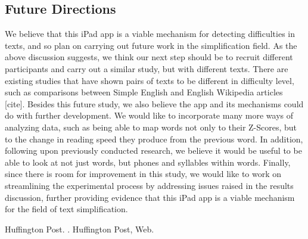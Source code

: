 \documentclass[11pt,letterpaper]{article}
\begin{document}
	\subsection{Future Directions}
	
	We believe that this iPad app is a viable mechanism for detecting difficulties in texts, and so plan on carrying out future work in the simplification field. As the above discussion suggests, we think our next step should be to recruit different participants and carry out a similar study, but with different texts. There are existing studies that have shown pairs of texts to be different in difficulty level, such as comparisons between Simple English and English Wikipedia articles [cite]. Besides this future study, we also believe the app and its mechanisms could do with further development. We would like to incorporate many more ways of analyzing data, such as being able to map words not only to their Z-Scores, but to the change in reading speed they produce from the previous word. In addition, following upon previously conducted research, we believe it would be useful to be able to look at not just words, but phones and syllables within words. Finally, since there is room for improvement in this study, we would like to work on streamlining the experimental process by addressing issues raised in the results discussion, further providing evidence that this iPad app is a viable mechanism for the field of text simplification.
	
%	
	
	\begin{thebibliography}{}
		
		{Huffington Post}.
		.
		\newblock Huffington Post, Web.
		
	\end{thebibliography}
	
\end{document}
